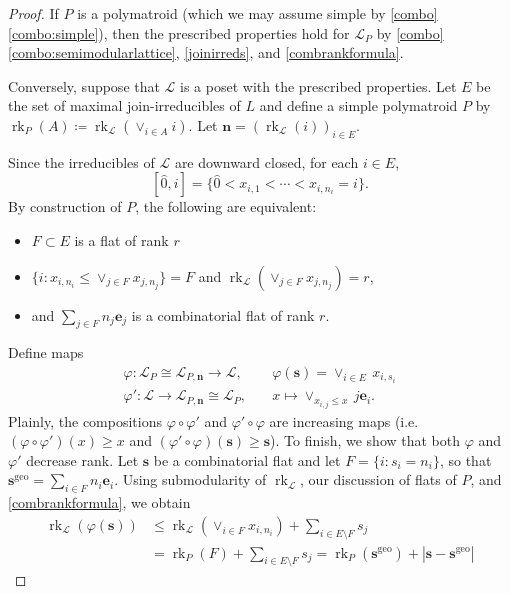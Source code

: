\documentclass[11pt]{article}
\theoremstyle{definition}
\numberwithin{equation}{section}
\newcommand{\geo}{\mathrm{geo}}
\DeclareMathOperator{\rk}{rk}
\newcommand{\ph}{\varphi}
\newcommand{\revision}[1]{{#1}}
\begin{document}
\begin{proof}
  If $P$ is a polymatroid (which we may assume simple by \cref{combo}\cref{combo:simple}), then the prescribed properties hold for $\mathcal L_P$ by \cref{combo}\cref{combo:semimodularlattice}, \cref{joinirreds}, and \cref{combrankformula}.

  Conversely, suppose that $\mathcal L$ is a poset with the prescribed properties.
  Let $E$ be the set of maximal join-irreducibles of $L$ and define a simple polymatroid $P$ by $\rk_P(A) \coloneqq \rk_{\mathcal L}(\vee_{i \in A} i)$.
  Let $\mathbf n = (\rk_{\mathcal L}(i))_{i \in E}$.

  Since the irreducibles of $\mathcal L$ are downward closed, for each $i \in E$,
  \[
  [\hat 0, i]  = \{\hat 0 < x_{i,1} < \cdots < x_{i, n_i} = i\}.
  \]
  By construction of $P$, the following are equivalent:
  \begin{itemize}
  \item $F \subset E$ is a flat of rank $r$
  \item  $\{i : x_{i,n_i} \leq \vee_{j \in F} x_{j, n_j}\} = F$ and $\rk_{\mathcal L}(\vee_{j \in F}  x_{j, n_j}) = r$,
  \item and $\sum_{j \in F} n_j \mathbf e_j$ is a combinatorial flat of rank $r$.
  \end{itemize}
  Define maps
  \begin{align*}
    \ph: \mathcal L_P \cong \mathcal L_{P, \mathbf n} \to \mathcal L,& \quad \ph(\mathbf s) = \vee_{i \in E}\, x_{i, s_i} \\
    \ph': \mathcal L \to \mathcal L_{P, \mathbf n} \cong \mathcal L_P, &\quad x \mapsto \vee_{x_{i,j} \leq x}\, j \mathbf e_i.
  \end{align*}
  Plainly, the compositions $\ph \circ \ph'$ and $\ph' \circ \ph$ are increasing maps \revision{(i.e. $(\ph \circ \ph')(x) \geq x$ and $(\ph' \circ \ph)(\mathbf s) \geq \mathbf s$)}.
  To finish, we show that both $\ph$ and $\ph'$ decrease rank.
  Let $\mathbf s$ be a combinatorial flat and let $F = \{i : s_i = n_i\}$, so that $\mathbf s^\geo = \sum_{i \in F} n_i \mathbf e_i$.
  Using submodularity of $\rk_{\mathcal L}$, our discussion of flats of $P$, and \cref{combrankformula}, we obtain
  \begin{align*}
    \rk_{\mathcal L}(\ph(\mathbf s))
    &\leq \rk_{\mathcal L}(\vee_{i \in F} x_{i, n_i}) + \sum_{i \in E \setminus F} s_j\\ 
    &= \rk_P(F) + \sum_{i \in E \setminus F} s_j
    = \rk_P(\mathbf s^\geo) + |\mathbf s - \mathbf s^\geo|

\end{align*}
\end{proof}
\end{document}
